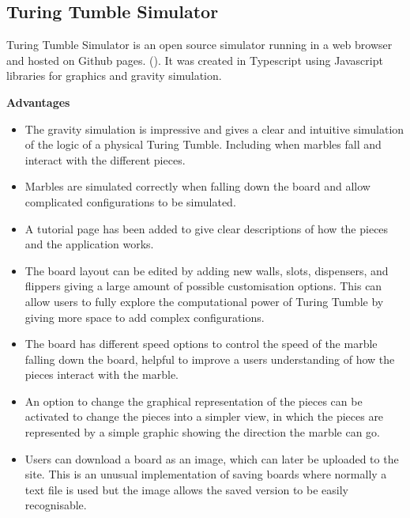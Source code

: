 \documentclass{l4proj}
\begin{document}
\subsection{Turing Tumble Simulator}
Turing Tumble Simulator is an open source simulator running in a web browser and hosted on Github pages. (\cite{turing_tumble_simulator}). It was created in Typescript using Javascript libraries for graphics and gravity simulation. 

\textbf{Advantages}
\begin{itemize}
    \item The gravity simulation is impressive and gives a clear and intuitive simulation of the logic of a physical Turing Tumble. Including when marbles fall and interact with the different pieces.
    \item Marbles are simulated correctly when falling down the board and allow complicated configurations to be simulated.
    \item A tutorial page has been added to give clear descriptions of how the pieces and the application works.
    \item The board layout can be edited by adding new walls, slots, dispensers, and flippers giving a large amount of possible customisation options. This can allow users to fully explore the computational power of Turing Tumble by giving more space to add complex configurations.
    \item The board has different speed options to control the speed of the marble falling down the board, helpful to improve a users understanding of how the pieces interact with the marble.
    \item An option to change the graphical representation of the pieces can be activated to change the pieces into a simpler view, in which the pieces are represented by a simple graphic showing the direction the marble can go.
    \item Users can download a board as an image, which can later be uploaded to the site. This is an unusual implementation of saving boards where normally a text file is used but the image allows the saved version to be easily recognisable.
\end{itemize}
\end{document}
